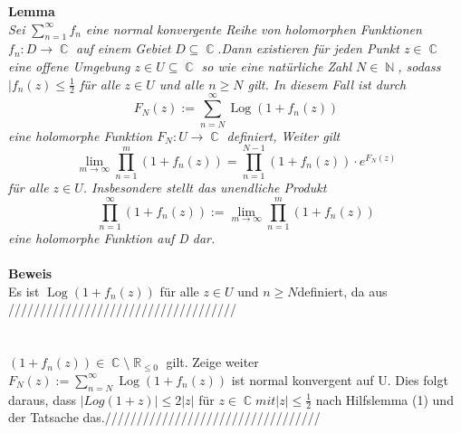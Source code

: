 \documentclass[10pt,a4paper]{article}
\DeclareMathOperator{\R}{\mathbb{R}}
\DeclareMathOperator{\C}{\mathbb{C}}
\DeclareMathOperator{\N}{\mathbb{N}}
\DeclareMathOperator{\Log}{Log}
\begin{document}
\textbf{Lemma}
\\
\textit{Sei} $\sum_{n =1}^\infty f_{\textit{n}}$ \textit{eine normal konvergente Reihe von holomorphen Funktionen} $f_{\textit{n}}: \textit{D}\rightarrow\C $ \textit{auf einem Gebiet}
$D\subseteq\C$.\textit{Dann existieren für jeden Punkt $ z \in \C$ eine offene Umgebung $z \in U \subseteq \C$ so wie eine natürliche Zahl $N \in \N$, sodass $|f_{\textit{n}}(z) \leq \frac{1}{2}$ für alle $z \in U $ und alle $n \geq N $ gilt. In diesem Fall ist durch $$F_{N}(z) := \sum_{n = N}^\infty \Log( 1 + f_{n}(z))$$ eine holomorphe Funktion $F_{N} : U \rightarrow \C$ definiert, Weiter gilt $$\lim_{m\rightarrow\infty}\prod_{n=1}^m ( 1 + f_{n}(z)) = \prod_{n=1}^{N-1} ( 1 + f_{n}(z))\cdot e^{F_{N}(z)}$$ für alle $z \in U$. Insbesondere stellt das unendliche Produkt$$\prod_{n=1}^\infty ( 1 + f_{n}(z)) := \lim_{m\rightarrow\infty}\prod_{n=1}^m ( 1 + f_{n}(z))$$ eine holomorphe Funktion auf D dar.}
\\
\\
\textbf{Beweis}
\\
Es ist $\Log( 1 + f_{n}(z))$ für alle $z \in U $ und $n \geq N$definiert, da aus ////////////////////////////////////
\\
\\
\\
 $(1 + f_{n}(z)) \in \C \setminus \R_{\leq 0 }$ gilt. Zeige weiter $F_{N}(z) := \sum_{n = N}^\infty \Log( 1 + f_{n}(z))$ ist normal konvergent auf U. Dies folgt daraus, dass $| Log( 1 + z) | \leq 2|z| $ für $z \in \C mit |z| \leq \frac{1}{2}$ nach Hilfslemma (1) und der Tatsache das.//////////////////////////////////
\end{document}
